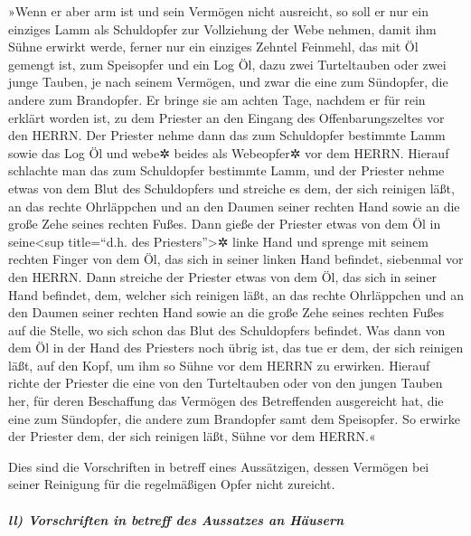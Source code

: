 »Wenn er aber arm ist und sein Vermögen nicht ausreicht,
so soll er nur ein einziges Lamm als Schuldopfer zur Vollziehung der
Webe nehmen, damit ihm Sühne erwirkt werde, ferner nur ein einziges
Zehntel Feinmehl, das mit Öl gemengt ist, zum Speisopfer und ein Log Öl,
dazu zwei Turteltauben oder zwei junge Tauben, je nach
seinem Vermögen, und zwar die eine zum Sündopfer, die andere zum
Brandopfer. Er bringe sie am achten Tage, nachdem er für
rein erklärt worden ist, zu dem Priester an den Eingang des
Offenbarungszeltes vor den HERRN. Der Priester nehme dann
das zum Schuldopfer bestimmte Lamm sowie das Log Öl und webe✲ beides als
Webeopfer✲ vor dem HERRN. Hierauf schlachte man das zum
Schuldopfer bestimmte Lamm, und der Priester nehme etwas von dem Blut
des Schuldopfers und streiche es dem, der sich reinigen läßt, an das
rechte Ohrläppchen und an den Daumen seiner rechten Hand sowie an die
große Zehe seines rechten Fußes. Dann gieße der Priester
etwas von dem Öl in seine\textless sup title=``d.h. des
Priesters''\textgreater✲ linke Hand und sprenge mit
seinem rechten Finger von dem Öl, das sich in seiner linken Hand
befindet, siebenmal vor den HERRN. Dann streiche der
Priester etwas von dem Öl, das sich in seiner Hand befindet, dem,
welcher sich reinigen läßt, an das rechte Ohrläppchen und an den Daumen
seiner rechten Hand sowie an die große Zehe seines rechten Fußes auf die
Stelle, wo sich schon das Blut des Schuldopfers befindet.
Was dann von dem Öl in der Hand des Priesters noch übrig
ist, das tue er dem, der sich reinigen läßt, auf den Kopf, um ihm so
Sühne vor dem HERRN zu erwirken. Hierauf richte der
Priester die eine von den Turteltauben oder von den jungen Tauben her,
für deren Beschaffung das Vermögen des Betreffenden ausgereicht hat,
die eine zum Sündopfer, die andere zum Brandopfer samt
dem Speisopfer. So erwirke der Priester dem, der sich reinigen läßt,
Sühne vor dem HERRN.«

Dies sind die Vorschriften in betreff eines Aussätzigen,
dessen Vermögen bei seiner Reinigung für die regelmäßigen Opfer nicht
zureicht.

\hypertarget{ll-vorschriften-in-betreff-des-aussatzes-an-huxe4usern}{%
\subparagraph{ll) Vorschriften in betreff des Aussatzes an
Häusern}\label{ll-vorschriften-in-betreff-des-aussatzes-an-huxe4usern}}

